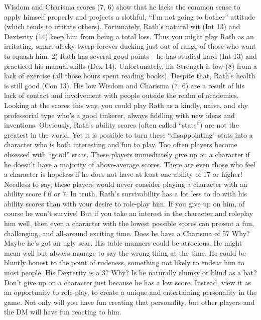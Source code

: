 \documentclass[../main.tex]{subfiles}
\begin{document}
\begin{multicols}{3}
Wisdom and Charisma scores (7, 6) show
that he lacks the common sense to apply
himself properly and projects a slothful,
“I'm not going to bother” attitude (which
tends to irritate others). Fortunately, Rath’s
natural wit (Int 13) and Dexterity (14) keep
him from being a total loss.
Thus you might play Rath as an irritating, smart-alecky twerp forever ducking
just out of range of those who want to
squash him.
2) Rath has several good points—he has
studied hard (Int 13) and practiced his manual skills (Dex 14). Unfortunately, his
Strength is low (8) from a lack of exercise
(all those hours spent reading books).
Despite that, Rath’s health is still good (Con
13). His low Wisdom and Charisma (7, 6)
are a result of his lack of contact and
involvement with people outside the realm
of academics.
Looking at the scores this way, you could
play Rath as a kindly, naive, and shy professorial type who's a good tinkerer, always
fiddling with new ideas and inventions.
Obviously, Rath’s ability scores (often
called “stats”) are not the greatest in the
world. Yet it is possible to turn these “disappointing” stats into a character who is both
interesting and fun to play. Too often players become obsessed with “good” stats.
These players immediately give up on a
character if he doesn’t have a majority of
above-average scores. There are even those
who feel a character is hopeless if he does
not have at least one ability of 17 or higher!
Needless to say, these players would never
consider playing a character with an ability
score f 6 or 7.
In truth, Rath’s survivability has a lot less
to do with his ability scores than with your
desire to role-play him. If you give up on
him, of course he won't survive! But if you
take an interest in the character and roleplay him well, then even a character with
the lowest possible scores can present a fun,
challenging, and all-around exciting time.
Does he have a Charisma of 57 Why? Maybe he's got an ugly scar. His table manners
could be atrocious. He might mean well but
always manage to say the wrong thing at the
time. He could be bluntly honest to
the point of rudeness, something not likely
to endear him to most people. His Dexterity
is a 3? Why? Is he naturally clumsy or blind
as a bat?
Don't give up on a character just because
he has a low score. Instead, view it as an
opportunity to role-play, to create a unique
and entertaining personality in the game.
Not only will you have fun creating that
personality, but other players and the DM
will have fun reacting to him.

	\end{multicols}
\end{document}
